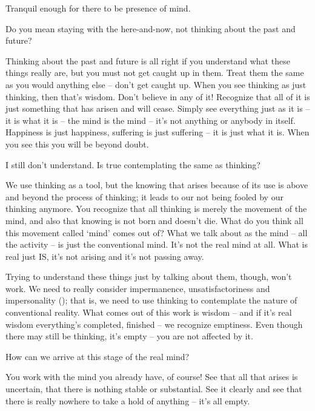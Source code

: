 Tranquil enough for there to be presence of mind.

Do you mean staying with the here-and-now, not thinking about the past and future?

Thinking about the past and future is all right if you understand what these things really are, but you must not get caught up in them. Treat them the same as you would anything else -- don't get caught up. When you see thinking as just thinking, then that's wisdom. Don't believe in any of it! Recognize that all of it is just something that has arisen and will cease. Simply see everything just as it is -- it is what it is -- the mind is the mind -- it's not anything or anybody in itself. Happiness is just happiness, suffering is just suffering -- it is just what it is. When you see this you will be beyond doubt.

I still don't understand. Is true contemplating the same as thinking?

We use thinking as a tool, but the knowing that arises because of its use is above and beyond the process of thinking; it leads to our not being fooled by our thinking anymore. You recognize that all thinking is merely the movement of the mind, and also that knowing is not born and doesn't die. What do you think all this movement called `mind' comes out of? What we talk about as the mind -- all the activity -- is just the conventional mind. It's not the real mind at all. What is real just IS, it's not arising and it's not passing away.

Trying to understand these things just by talking about them, though, won't work. We need to really consider impermanence, unsatisfactoriness and impersonality (); that is, we need to use thinking to contemplate the nature of conventional reality. What comes out of this work is wisdom -- and if it’s real wisdom everything’s completed, finished -- we recognize emptiness. Even though there may still be thinking, it's empty -- you are not affected by it.

How can we arrive at this stage of the real mind?

You work with the mind you already have, of course! See that all that arises is uncertain, that there is nothing stable or substantial. See it clearly and see that there is really nowhere to take a hold of anything -- it's all empty.

